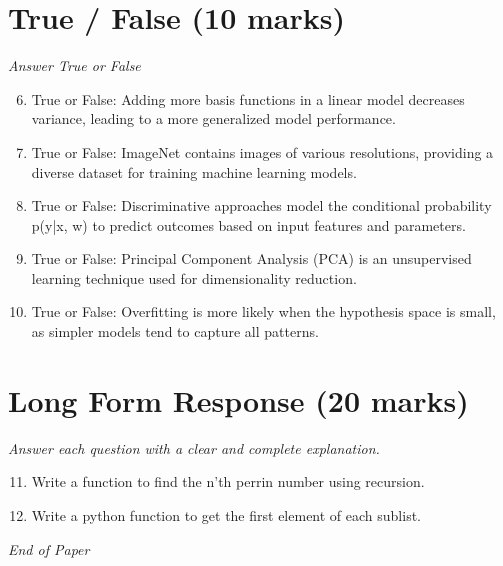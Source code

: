 \documentclass[12pt]{article}
\begin{document}
\section*{True / False (10 marks)}
\textit{Answer True or False}
\begin{enumerate}[label=\arabic*.]
\setcounter{enumi}{5}
\item True or False: Adding more basis functions in a linear model decreases variance, leading to a more generalized model performance.
\item True or False: ImageNet contains images of various resolutions, providing a diverse dataset for training machine learning models.
\item True or False: Discriminative approaches model the conditional probability p(y|x, w) to predict outcomes based on input features and parameters.
\item True or False: Principal Component Analysis (PCA) is an unsupervised learning technique used for dimensionality reduction.
\item True or False: Overfitting is more likely when the hypothesis space is small, as simpler models tend to capture all patterns.
\end{enumerate}

\section*{Long Form Response (20 marks)}
\textit{Answer each question with a clear and complete explanation.}
\begin{enumerate}[label=\arabic*.]
\setcounter{enumi}{10}
\item Write a function to find the n'th perrin number using recursion.
\item Write a python function to get the first element of each sublist.
\end{enumerate}

\vfill
\noindent\textit{End of Paper}
\end{document}
